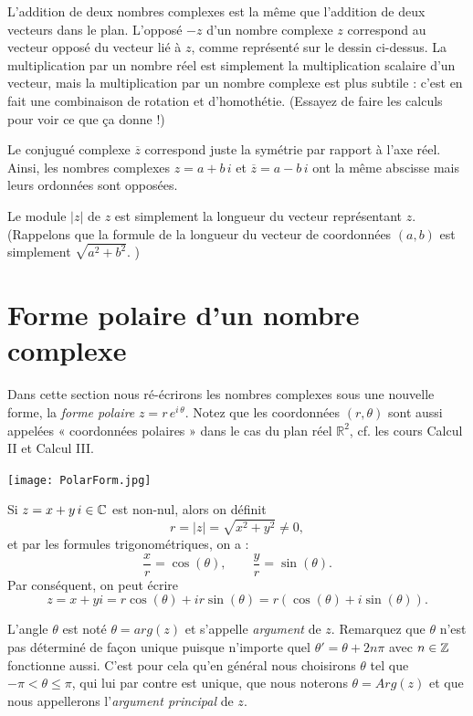 L'addition de deux nombres complexes est la même que l'addition de
deux vecteurs dans le plan.  L'opposé $-z$ d'un nombre complexe $z$ correspond au vecteur opposé du vecteur lié à $z$, comme représenté sur le dessin ci-dessus.  La multiplication
par un nombre réel est simplement la multiplication scalaire d'un vecteur, mais la multiplication
par un nombre complexe est plus subtile : c'est en fait une combinaison de rotation et d'homothétie.
(Essayez de faire les calculs pour voir ce que ça donne !)

Le conjugué complexe $\overline{z}$ correspond juste la symétrie par rapport à l'axe réel.  Ainsi, les nombres complexes $z = a+b\,i$ et $\overline{z} = a-b\,i$ ont la même abscisse mais leurs ordonnées sont opposées.

Le module $|z|$ de $z$ est simplement la longueur du vecteur représentant $z$.
(Rappelons que la formule de la longueur du vecteur de coordonnées $(a,b)$ est simplement
$\sqrt{a^2+b^2}$. )

\section{Forme polaire d'un nombre complexe}


Dans cette section nous ré-écrirons les nombres complexes sous une nouvelle forme, la \emph{forme polaire} $z= r\, e^{i\, \theta}$. Notez que les coordonnées $(r,\theta)$ sont aussi appelées « coordonnées polaires » dans le cas du plan réel $\mathbb R^2$, cf. les cours Calcul II et Calcul III.


 \begin{center}
\texttt{[image: PolarForm.jpg]}~\\[1cm]
\end{center}




Si $z = x+y\,i \in \mathbb{C}$ est non-nul, alors on définit 
$$
r = \vert z \vert = \sqrt{x^2+y^2} \neq 0,
$$
et par les formules trigonométriques, on a :
$$
\frac{x}{r} = \cos(\theta), \qquad \frac{y}{r} = \sin(\theta).
$$
Par conséquent, on peut écrire
$$
z = x+yi = r \cos(\theta) + i r\sin(\theta) = r(\cos(\theta)+i \sin(\theta)).
$$

L'angle $\theta$ est noté $\theta = arg(z)$ et s'appelle \emph{argument} de $z$. Remarquez que $\theta$ n'est pas déterminé de fa\c{c}on unique
puisque n'importe quel $\theta' = \theta + 2n\pi$ avec $n\in \mathbb{Z}$ fonctionne aussi.  C'est pour cela qu'en général nous
choisirons $\theta$ tel que $-\pi < \theta \leq \pi$, qui lui par contre est unique, que nous noterons $\theta = Arg(z)$ et que nous appellerons l'\emph{argument principal} de $z$.

